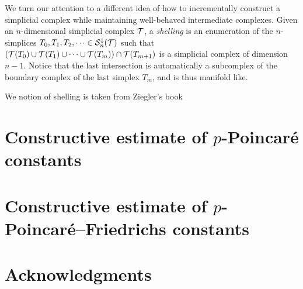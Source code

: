 \documentclass[a4paper]{article}
\begin{document}


We turn our attention to a different idea of how to incrementally construct a simplicial complex while maintaining well-behaved intermediate complexes. 
Given an $n$-dimensional simplicial complex ${\mathcal T}$, a \emph{shelling} is an enumeration of the $n$-simplices $T_{0}, T_{1}, T_{2}, \dots \in {\mathcal S}^{\downarrow}_{n}({\mathcal T})$ such that $( {\mathcal T}(T_{0}) \cup {\mathcal T}(T_{1}) \cup \dots \cup {\mathcal T}(T_{m}) ) \cap {\mathcal T}(T_{m+1})$ is a simplicial complex of dimension $n-1$. Notice that the last intersection is automatically a subcomplex of the boundary complex of the last simplex $T_{m}$, and is thus manifold like. 



We notion of shelling is taken from Ziegler's book~\cite{}


% 


\section{Constructive estimate of $p$-Poincar\'e constants}


\section{Constructive estimate of $p$-Poincar\'e--Friedrichs constants}

\section*{Acknowledgments}



\end{document}
